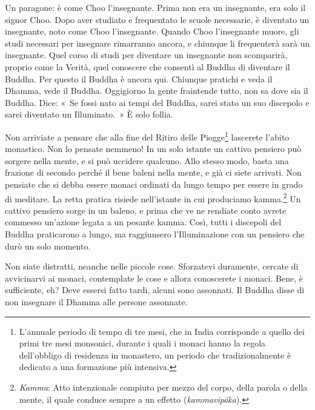 Un paragone: è come Choo l'insegnante. Prima non era un insegnante, era
solo il signor Choo. Dopo aver studiato e frequentato le scuole
necessarie, è diventato un insegnante, noto come Choo l'insegnante.
Quando Choo l'insegnante muore, gli studi necessari per insegnare
rimarranno ancora, e chiunque li frequenterà sarà un insegnante. Quel
corso di studi per diventare un insegnante non scomparirà, proprio come
la Verità, quel conoscere che consentì al Buddha di diventare il Buddha.
Per questo il Buddha è ancora qui. Chiunque pratichi e veda il Dhamma,
vede il Buddha. Oggigiorno la gente fraintende tutto, non sa dove sia il
Buddha. Dice: «~Se fossi nato ai tempi del Buddha, sarei stato un suo
discepolo e sarei diventato un Illuminato.~» È solo follia.

Non arriviate a pensare che alla fine del Ritiro delle Piogge\footnote{L'annuale
  periodo di tempo di tre mesi, che in India corrisponde a quello dei
  primi tre mesi monsonici, durante i quali i monaci hanno la regola
  dell'obbligo di residenza in monastero, un periodo che
  tradizionalmente è dedicato a una formazione più intensiva.} lascerete
l'abito monastico. Non lo pensate nemmeno! In un solo istante un cattivo
pensiero può sorgere nella mente, e si può uccidere qualcuno. Allo
stesso modo, basta una frazione di secondo perché il bene baleni nella
mente, e già ci siete arrivati. Non pensiate che si debba essere monaci
ordinati da lungo tempo per essere in grado di meditare. La retta
pratica risiede nell'istante in cui produciamo kamma.\footnote{%
  \emph{Kamma}:
  Atto intenzionale compiuto per mezzo del corpo, della parola o della
  mente, il quale conduce sempre a un effetto (\emph{kammavipāka}).}
Un cattivo pensiero sorge in un baleno, e prima che ve ne rendiate conto
avrete commesso un'azione legata a un pesante kamma. Così, tutti
i discepoli del Buddha praticarono a lungo, ma raggiunsero
l'Illuminazione con un pensiero che durò un solo momento.

Non siate distratti, neanche nelle piccole cose. Sforzatevi duramente,
cercate di avvicinarvi ai monaci, contemplate le cose e allora
conoscerete i monaci. Bene, è sufficiente, eh? Deve essersi fatto tardi,
alcuni sono assonnati. Il Buddha disse di non insegnare il Dhamma alle
persone assonnate.

